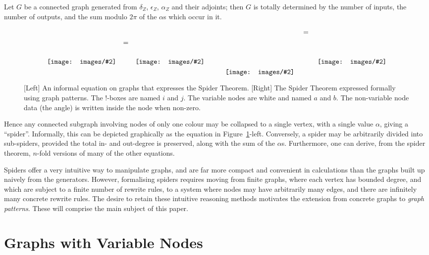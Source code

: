 \documentclass[runningheads]{llncs}
\newcommand{\inlinegraphic}[2]{
  \dimendef\grafheight=255\dimendef\grafvshift=254
  \grafheight=#1
  \grafvshift=-0.5\grafheight
  \advance\grafvshift by 0.5ex
  \raisebox{\grafvshift}{\texttt{[image: images/\#2]}\xspace}
}
\begin{document}
\begin{theorem}
  Let $G$ be a connected graph generated
  from $\delta_Z$, $\epsilon_Z$, $\alpha_Z$ and their adjoints; then
  $G$ is totally determined by the number of inputs, the number of
  outputs, and the sum modulo $2\pi$ of the $\alpha$s which occur in
  it.
\end{theorem}

\begin{figure}[t]
$$\begin{array}{ccc}
\inlinegraphic{6em}{spider_lhs} & = & \inlinegraphic{6em}{spider_rhs}
\end{array}\qquad
\begin{array}{ccc}
\inlinegraphic{12em}{spider_lhs_patt} & \;=\; & \inlinegraphic{9em}{spider_rhs_patt}
\end{array}$$
\label{fig:spider}\caption{ [Left] An informal equation on graphs that
  expresses the Spider Theorem.  [Right] The Spider Theorem expressed
  formally using graph patterns.  The !-boxes are named $i$ and $j$.
  The variable nodes are white and named $a$ and $b$. The non-variable
  node data (the angle) is written inside the node when non-zero.}

\end{figure}

Hence any connected subgraph involving nodes of only one colour may be
collapsed to a single vertex, with a single value $\alpha$, giving a
``spider''. Informally, this can be depicted graphically as the
equation in Figure~\ref{fig:spider}-left. Conversely, a spider may be
arbitrarily divided into sub-spiders, provided the total in- and
out-degree is preserved, along with the sum of the $\alpha$s.
Furthermore, one can derive, from the spider theorem, $n$-fold versions of
many of the other equations.

Spiders offer a very intuitive way to manipulate graphs, and are far
more compact and convenient in calculations than the graphs built up
naively from the generators.  However, formalising spiders requires
moving from finite graphs, where each vertex has bounded degree, and
which are subject to a finite number of rewrite rules, to a system
where nodes may have arbitrarily many edges, and there are infinitely
many concrete rewrite rules. The desire to retain these intuitive
reasoning methods motivates the extension from concrete graphs to
\emph{graph patterns}. These will comprise the main subject of this
paper.

\section{Graphs with Variable Nodes}
\end{document}
